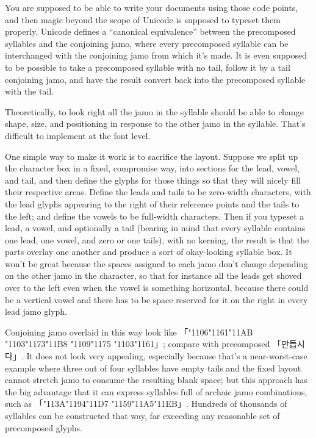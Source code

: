 \documentclass[14pt]{extarticle}
\begin{document}
You are supposed to be able to write your documents using those code points,
and then magic beyond the scope of Unicode is supposed to typeset them
properly.  Unicode defines a ``canonical equivalence'' between the
precomposed syllables and the conjoining jamo, where every precomposed
syllable can be interchanged with the conjoining jamo from which it's made. 
It is even supposed to be possible to take a precomposed syllable with no
tail, follow it by a tail conjoining jamo, and have the result convert back
into the precomposed syllable with the tail.

Theoretically, to look right all the jamo in
the syllable should be able to change shape, size, and positioning in
response to the other jamo in the syllable.  That's difficult to implement
at the font level.

One simple way to make it work is to sacrifice the layout.  Suppose we split
up the character box in a fixed, compromise way, into sections for the lead,
vowel, and tail, and then define the glyphs for those things so that they
will nicely fill their respective areas.  Define the leads and tails to be
zero-width characters, with the lead glyphs appearing to the right of their
reference points and the tails to the left; and define the vowels to be
full-width characters.  Then if you typeset a lead, a vowel, and optionally
a tail (bearing in mind that every syllable contains one lead, one vowel,
and zero or one tails), with no kerning, the result is that the parts
overlay one another and produce a sort of okay-looking syllable box.  It
won't be great because the spaces assigned to each jamo don't change
depending on the other jamo in the character, so that for instance all the
leads get shoved over to the left even when the vowel is something
horizontal, because there could be a vertical vowel and there has to be
space reserved for it on the right in every lead jamo glyph.

Conjoining jamo overlaid in this way look like
{%
「\char"1106\char"1161\char"11AB%
\char"1103\char"1173\char"11B8%
\char"1109\char"1175%
\char"1103\char"1161」}; compare with precomposed {\dodum 「만듭시다」}.  It
does not look very appealing, especially because that's a near-worst-case
example where three out of four syllables have empty tails and the fixed
layout cannot stretch jamo to consume the resulting blank space; but this
approach has the big advantage that it can express syllables full of archaic
jamo combinations, such as {\dodum 「\char"113A\char"1194\char"11D7%
\char"1159\char"11A5\char"11EB」}.  Hundreds of thousands of syllables can
be constructed that way, far exceeding any reasonable set of precomposed
glyphs.
\end{document}
